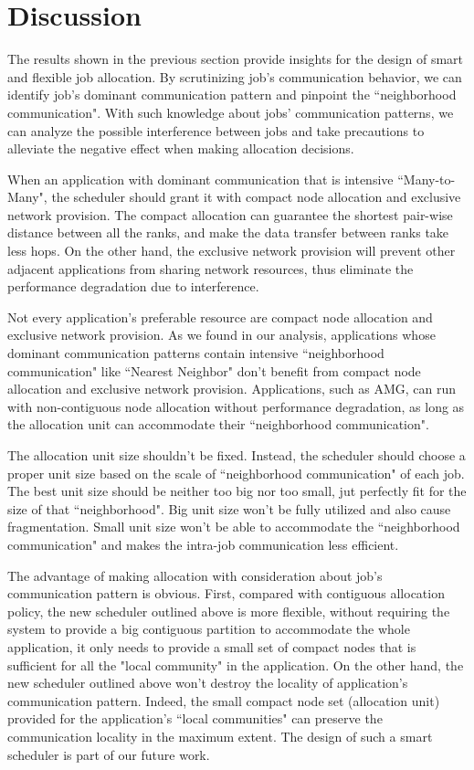 
\section{Discussion}
\label{sec:discussion}

The results shown in the previous section provide insights for the design of smart and flexible job allocation. By scrutinizing job's communication behavior, we can identify job's dominant communication pattern and pinpoint the ``neighborhood communication". With such knowledge about jobs' communication patterns, we can analyze the possible interference between jobs and take precautions to alleviate the negative effect when making allocation decisions. 

When an application with dominant communication that is intensive ``Many-to-Many", the scheduler should grant it with compact node allocation and exclusive network provision. The compact allocation can guarantee the shortest pair-wise distance between all the ranks, and make the data transfer between ranks take less hops. On the other hand, the exclusive network provision will prevent other adjacent applications from sharing network resources, thus eliminate the performance degradation due to interference.

Not every application's preferable resource are compact node allocation and exclusive network provision. As we found in our analysis, applications whose dominant communication patterns contain intensive ``neighborhood communication" like ``Nearest Neighbor" don't benefit from compact node allocation and exclusive network provision. Applications, such as AMG, can run with non-contiguous node allocation without performance degradation, as long as the allocation unit can accommodate their ``neighborhood communication".

The allocation unit size shouldn't be fixed. Instead, the scheduler should choose a proper unit size based on the scale of ``neighborhood communication" of each job. The best unit size should be neither too big nor too small, jut perfectly fit for the size of that ``neighborhood". Big unit size won't be fully utilized and also cause fragmentation. Small unit size won't be able to accommodate the ``neighborhood communication" and makes the intra-job communication less efficient. 


The advantage of making allocation with consideration about job's communication pattern is obvious. First, compared with contiguous allocation policy, the new scheduler outlined above is more flexible, without requiring the system to provide a big contiguous partition to accommodate the whole application, it only needs to provide a small set of compact nodes that is sufficient for all the "local community" in the application. On the other hand, the new scheduler outlined above won't destroy the locality of application's communication pattern. Indeed, the small compact node set (allocation unit) provided for the application's  ``local communities" can preserve the communication locality in the maximum extent. The design of such a smart scheduler is part of our future work. 



